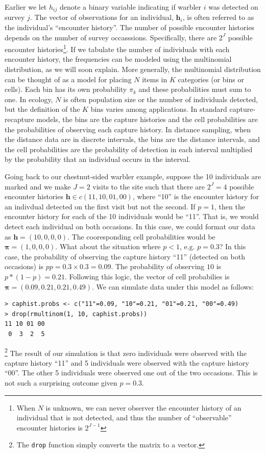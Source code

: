 Earlier we let $h_{ij}$ denote a binary variable indicating if
warbler $i$ was detected on survey $j$. The vector of observations for an
individual, $\mathbf{h}_i$, is often referred to as the individual's
``encounter history''. The number of possible encounter
histories depends on the number of survey occasssions. Specifically,
there are $2^J$
possible encounter histories\footnote{When $N$ is unknown, we can
  never observer the encounter history of an individual that is not
  detected, and thus the number of ``observable'' encounter histories
  is $2^{J-1}$}.
If we tabulate the number of individuals with each encounter history,
the frequencies can be modeled using the multinomial
distribution, as we will soon explain.
More generally, the multinomial distribution can be thought of as a
model for placing $N$ items in $K$
categories (or bins or cells). Each bin has
its own probability $\pi_k$ and
these probabilities must sum to one.
In ecology, $N$ is often population size or the number of individuals
detected, but the definition of the $K$ bins varies among
applications. In standard capture-recapture models, the bins are the
capture histories and the cell probabilities are the probabilities of
observing each capture history. In
distance sampling, when the distance data are in discrete intervals,
the bins are the distance intervals, and the cell probabilities are
the probability of detection in each interval multiplied by the
probability that an individual occurs in the interval.

Going back to our
chestnut-sided warbler example, suppose the 10 individuals are marked
and we make $J=2$ visits to the site such that there are $2^J = 4$ possible encounter
histories $\mathbf{h} \in c(11, 10, 01, 00)$, where ``10'' is the
encounter history for an indivdual detected on the first visit but not
the second. If $p=1$, then the
encounter history for each of the 10 individuals would be ``11''. That
is, we would detect each individual on both occasions. In this case,
we could format our data as $\mathbf{h} = (10, 0, 0, 0)$. The
cooresponding cell probabilities would be $\bm{\pi} = (1, 0, 0,
0)$. What about the situation where $p<1$, e.g. $p=0.3$? In this case, the
probability of observing the capture history ``11'' (detected on both
occasions) is $pp = 0.3 \times 0.3 = 0.09$. The probability of
observing $10$ is $p*(1-p) = 0.21$. Following this logic, the vector
of cell probabilies is $\bm{\pi} = (0.09, 0.21, 0.21, 0.49)$. We can
simulate data under this model as follows:
\begin{verbatim}
> caphist.probs <- c("11"=0.09, "10"=0.21, "01"=0.21, "00"=0.49)
> drop(rmultinom(1, 10, caphist.probs))
11 10 01 00
 0  3  2  5
\end{verbatim}\footnote{The \verb+drop+ function simply converts the matrix to a vector.}
The
result of our simulation is that zero individuals were observed with
the capture history ``11'' and 5 individuals were observed with the
capture history ``00''. The other 5 individuals were observed one out
of the two occasions. This is not such a surprising outcome given
$p=0.3$.

